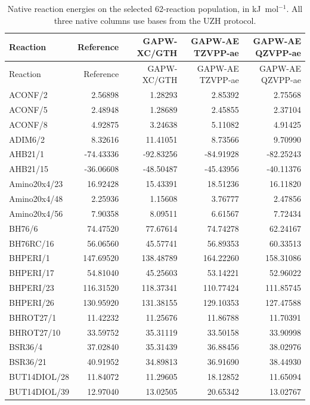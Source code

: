 \documentclass[10pt,a4paper]{article}
\begin{document}
\FloatBarrier
{\small
\begin{longtable}{@{}lrrrr@{}}
\caption{Native reaction energies on the selected 62-reaction population, in kJ~mol$^{-1}$. All three native columns use bases from the UZH protocol.}\label{tab:common62-native}\\
\toprule
Reaction & Reference & GAPW-XC/GTH & GAPW-AE TZVPP-ae & GAPW-AE QZVPP-ae \\
\midrule
\endfirsthead
\toprule
Reaction & Reference & GAPW-XC/GTH & GAPW-AE TZVPP-ae & GAPW-AE QZVPP-ae \\
\midrule
\endhead
ACONF/2 & 2.56898 & 1.28293 & 2.85392 & 2.75568 \\
ACONF/5 & 2.48948 & 1.28689 & 2.45855 & 2.37104 \\
ACONF/8 & 4.92875 & 3.24638 & 5.11082 & 4.91425 \\
ADIM6/2 & 8.32616 & 11.41051 & 8.73566 & 9.70990 \\
AHB21/1 & -74.43336 & -92.83256 & -84.91928 & -82.25243 \\
AHB21/15 & -36.06608 & -48.50487 & -45.43956 & -40.11376 \\
Amino20x4/23 & 16.92428 & 15.43391 & 18.51236 & 16.11820 \\
Amino20x4/48 & 2.25936 & 1.15608 & 3.76777 & 2.47856 \\
Amino20x4/56 & 7.90358 & 8.09511 & 6.61567 & 7.72434 \\
BH76/6 & 74.47520 & 77.67614 & 74.74278 & 62.24167 \\
BH76RC/16 & 56.06560 & 45.57741 & 56.89353 & 60.33513 \\
BHPERI/1 & 147.69520 & 138.48789 & 164.22260 & 158.31086 \\
BHPERI/17 & 54.81040 & 45.25603 & 53.14221 & 52.96022 \\
BHPERI/23 & 116.31520 & 118.37341 & 110.77424 & 111.85745 \\
BHPERI/26 & 130.95920 & 131.38155 & 129.10353 & 127.47588 \\
BHROT27/1 & 11.42232 & 11.25676 & 11.86788 & 11.70391 \\
BHROT27/10 & 33.59752 & 35.31119 & 33.50158 & 33.90998 \\
BSR36/4 & 37.02840 & 35.31439 & 36.88456 & 38.02976 \\
BSR36/21 & 40.91952 & 34.89813 & 36.91690 & 38.44930 \\
BUT14DIOL/28 & 11.84072 & 11.29605 & 18.12852 & 11.65094 \\
BUT14DIOL/39 & 12.97040 & 13.02505 & 20.65342 & 13.02767 \\

\end{longtable}}
\end{document}
